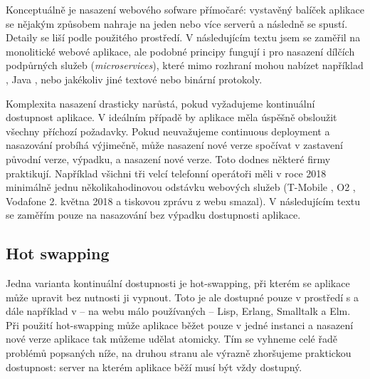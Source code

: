        Konceptuálně je nasazení webového sofware přímočaré: vystavěný balíček aplikace se nějakým způsobem nahraje na jeden nebo více serverů a následně se spustí. Detaily se liší podle použitého prostředí. V následujícím textu jsem se zaměřil na monolitické webové aplikace, ale podobné principy fungují i pro nasazení dílčích podpůrných služeb (\textit{microservices}), které mimo \HTTP rozhraní mohou nabízet například , Java , nebo jakékoliv jiné textové nebo binární protokoly.

        Komplexita nasazení drasticky narůstá, pokud vyžadujeme kontinuální dostupnost aplikace. V ideálním případě by aplikace měla úspěšně obsloužit všechny příchozí požadavky. Pokud neuvažujeme continuous deployment a nasazování probíhá výjimečně, může nasazení nové verze spočívat v zastavení původní verze, výpadku, a nasazení nové verze. Toto dodnes některé firmy praktikují. Například všichni tři velcí telefonní operátoři měli v roce 2018 minimálně jednu několikahodinovou odstávku webových služeb (T-Mobile \cite{tmobile-odstavka}, O2 \cite{o2-odstavka}, Vodafone 2. května 2018 a tiskovou zprávu z webu smazal). V následujícím textu se zaměřím pouze na nasazování bez výpadku dostupnosti aplikace.

        \subsection{Hot swapping}
            Jedna varianta kontinuální dostupnosti je hot-swapping, při kterém se aplikace může upravit bez nutnosti ji vypnout. Toto je ale dostupné pouze v prostředí s  a dále například v -- na webu málo používaných -- Lisp, Erlang, Smalltalk a Elm. Při použití hot-swapping může aplikace běžet pouze v jedné instanci a nasazení nové verze aplikace tak můžeme udělat atomicky. Tím se vyhneme celé řadě problémů popsaných níže, na druhou stranu ale výrazně zhoršujeme praktickou dostupnost: server na kterém aplikace běží musí být vždy dostupný.

